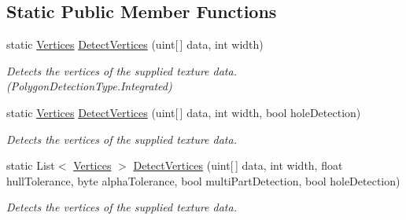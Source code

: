 \subsection*{Static Public Member Functions}
\begin{DoxyCompactItemize}
\item 
static \hyperlink{class_farseer_physics_1_1_common_1_1_vertices}{Vertices} \hyperlink{class_farseer_physics_1_1_common_1_1_texture_tools_1_1_texture_converter_af065998af049be57013a532d54577f3d}{Detect\+Vertices} (uint\mbox{[}$\,$\mbox{]} data, int width)
\begin{DoxyCompactList}\small\item\em Detects the vertices of the supplied texture data. (Polygon\+Detection\+Type.\+Integrated) \end{DoxyCompactList}\item 
static \hyperlink{class_farseer_physics_1_1_common_1_1_vertices}{Vertices} \hyperlink{class_farseer_physics_1_1_common_1_1_texture_tools_1_1_texture_converter_a04a9acf7681849a9dc583b0cebbe058b}{Detect\+Vertices} (uint\mbox{[}$\,$\mbox{]} data, int width, bool hole\+Detection)
\begin{DoxyCompactList}\small\item\em Detects the vertices of the supplied texture data. \end{DoxyCompactList}\item 
static List$<$ \hyperlink{class_farseer_physics_1_1_common_1_1_vertices}{Vertices} $>$ \hyperlink{class_farseer_physics_1_1_common_1_1_texture_tools_1_1_texture_converter_a9912dfec3261594c9b8d262abd72f6f7}{Detect\+Vertices} (uint\mbox{[}$\,$\mbox{]} data, int width, float hull\+Tolerance, byte alpha\+Tolerance, bool multi\+Part\+Detection, bool hole\+Detection)
\begin{DoxyCompactList}\small\item\em Detects the vertices of the supplied texture data. \end{DoxyCompactList}\end{DoxyCompactItemize}
